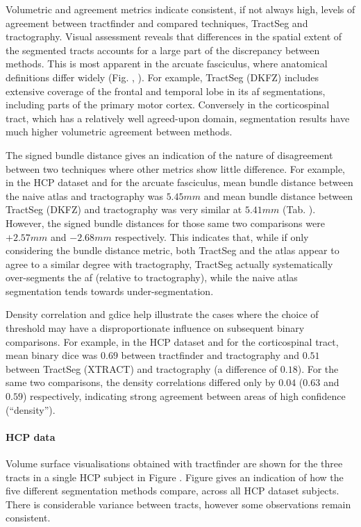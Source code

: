 Volumetric and agreement metrics indicate consistent, if not always high, levels of agreement between tractfinder and compared techniques, TractSeg and tractography.
Visual assessment reveals that differences in the spatial extent of the segmented tracts accounts for a large part of the discrepancy between methods.
This is most apparent in the arcuate fasciculus, where anatomical definitions differ widely (Fig. , ).
For example, TractSeg (DKFZ) includes extensive coverage of the frontal and temporal lobe in its \gls{af} segmentations, including parts of the primary motor cortex.
Conversely in the corticospinal tract, which has a relatively well agreed-upon domain, segmentation results have much higher volumetric agreement between methods.

The signed bundle distance gives an indication of the nature of disagreement between two techniques where other metrics show little difference.
For example, in the HCP dataset and for the arcuate fasciculus, mean bundle distance between the naive atlas and tractography was $5.45 mm$ and mean bundle distance between TractSeg (DKFZ) and tractography was very similar at $5.41 mm$ (Tab. ).
However, the signed bundle distances for those same two comparisons were $+2.57 mm$ and $-2.68 mm$ respectively.
This indicates that, while if only considering the bundle distance metric, both TractSeg and the atlas appear to agree to a similar degree with tractography, TractSeg actually systematically over-segments the \gls{af} (relative to tractography), while the naive atlas segmentation tends towards under-segmentation.

Density correlation and \gls{gdice} help illustrate the cases where the choice of threshold may have a disproportionate influence on subsequent binary comparisons.
For example, in the HCP dataset and for the corticospinal tract, mean binary \gls{dice} was $0.69$ between tractfinder and tractography and $0.51$ between TractSeg (XTRACT) and tractography (a difference of $0.18$).
For the same two comparisons, the density correlations differed only by $0.04$ ($0.63$ and $0.59$) respectively, indicating strong agreement between areas of high confidence (``density'').

\paragraph*{HCP data}

Volume surface visualisations obtained with tractfinder are shown for the three tracts in a single HCP subject in Figure .
Figure  gives an indication of how the five different segmentation methods compare, across all HCP dataset subjects.
There is considerable variance between tracts, however some observations remain consistent.

